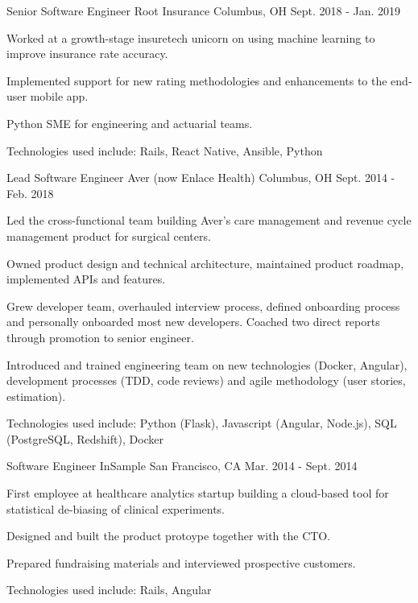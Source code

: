 \begin{cventries}
  \cventry
    {Senior Software Engineer} %
    {Root Insurance} %
    {Columbus, OH} %
    {Sept. 2018 - Jan. 2019} %
    {
      \begin{cvitems} %
        \item {Worked at a growth-stage insuretech unicorn on using machine learning to improve insurance rate accuracy.}
        \item {Implemented support for new rating methodologies and enhancements to the end-user mobile app.}
        \item {Python SME for engineering and actuarial teams.}
        \item {Technologies used include: Rails, React Native, Ansible, Python}
      \end{cvitems}
    }

  \cventry
    {Lead Software Engineer} %
    {Aver (now Enlace Health)} %
    {Columbus, OH} %
    {Sept. 2014 - Feb. 2018} %
    {
      \begin{cvitems} %
        \item {Led the cross-functional team building Aver's care management and revenue cycle management product for surgical centers.}
        \item {Owned product design and technical architecture, maintained product roadmap, implemented APIs and features.}
        \item {Grew developer team, overhauled interview process, defined onboarding process and personally onboarded most new developers. Coached two direct reports through promotion to senior engineer.}
        \item {Introduced and trained engineering team on new technologies (Docker, Angular), development processes (TDD, code reviews) and agile methodology (user stories, estimation).}
        \item {Technologies used include: Python (Flask), Javascript (Angular, Node.js), SQL (PostgreSQL, Redshift), Docker}
      \end{cvitems}
    }

  \cventry
    {Software Engineer} %
    {InSample} %
    {San Francisco, CA} %
    {Mar. 2014 - Sept. 2014} %
    {
      \begin{cvitems} %
        \item {First employee at healthcare analytics startup building a cloud-based tool for statistical de-biasing of clinical experiments.}
        \item {Designed and built the product protoype together with the CTO.}
        \item {Prepared fundraising materials and interviewed prospective customers.}
        \item {Technologies used include: Rails, Angular}
      \end{cvitems}
    }


\end{cventries}

